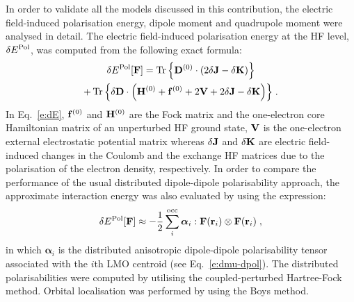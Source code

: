 \documentclass[aip,amsmath,amssymb,reprint,floatfix]{revtex4-1}
\newcommand{\BM}[1]{\bm{#1}}
\DeclareMathOperator{\Tr}{Tr}
\begin{document}
In order to validate all the models discussed in this contribution,
the electric field\hyp{}induced polarisation energy, 
dipole moment and quadrupole moment were analysed in detail.
The electric field\hyp{}induced polarisation energy at the HF level, $\delta E^{\rm Pol}$,
was computed from the following exact formula:
%
\begin{multline}\label{e:dE}
 \delta E^{\rm Pol}[{\bf F}] = 
                     \Tr{\left\{ {\bf D}^{(0)} \cdot
                                \left( 2\delta {\bf J} - \delta {\bf K}  \right) \right\}} \\
                   + \Tr{\left\{ \delta {\bf D} \cdot
                                \left( {\bf H}^{(0)} + {\bf f}^{(0)} + 2{\bf V} + 2\delta {\bf J} - \delta {\bf K}\right) \right\}} \;.
\end{multline}
%
In Eq.~\eqref{e:dE}, ${\bf f}^{(0)}$ and ${\bf H}^{(0)}$ are the Fock matrix and 
the one\hyp{}electron core Hamiltonian matrix of an unperturbed HF ground state,
${\bf V}$ is the one\hyp{}electron external electrostatic potential matrix whereas $\delta {\bf J}$
and $\delta {\bf K}$ are electric field\hyp{}induced changes in the Coulomb and the exchange HF matrices due to 
the polarisation of the electron density, respectively. 
In order to compare the performance of the usual 
distributed dipole\hyp{}dipole polarisability approach,
the approximate interaction energy was also evaluated by using the expression:
%
\begin{equation}\label{e:dE-dpol}
 \delta E^{\rm Pol}[{\bf F}] \approx 
                   - \frac{1}{2} \sum_i^{\rm occ} {\BM \alpha}_i : {\bf F}({\bf r}_i) \otimes {\bf F}({\bf r}_i) \;,
\end{equation}
%
in which ${\BM \alpha}_i$ is the distributed anisotropic dipole\hyp{}dipole polarisability tensor associated with the
$i$th LMO centroid (see Eq.~\eqref{e:dmu-dpol}).
The distributed polarisabilities were computed by utilising the coupled\hyp{}perturbed Hartree\hyp{}Fock
method.\cite{McWeeny.RevModPhys.1960,Dodds.McWeeney.Sadlej.MolPhys.1977} 
Orbital localisation was performed by using the Boys method.\cite{Boys.RevModPhys.1960} 
\end{document}
